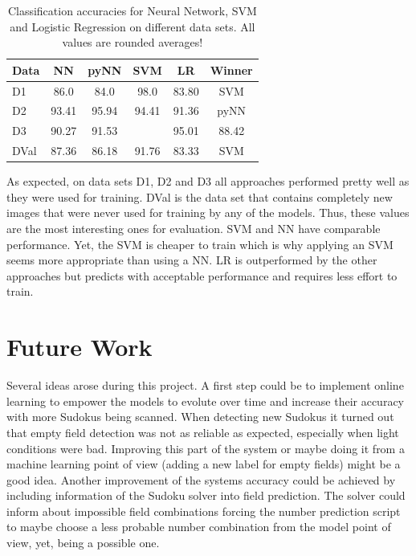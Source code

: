 \documentclass{article}
\begin{document}
\begin{table}[t]
\caption{Classification accuracies for Neural Network, SVM and Logistic Regression on different data sets. All values are rounded averages!}
\label{sample-table}
\vskip 0.15in
\begin{center}
\begin{small}
\begin{sc}
\begin{tabular}{lccccc}
\hline
\abovespace\belowspace
Data & NN & pyNN & SVM & LR & Winner \\
\hline
\abovespace
D1 		& 86.0 & 84.0 & 98.0 & 83.80 & SVM\\
D2		& 93.41 & 95.94 & 94.41 & 91.36 & pyNN\\
D3		& 90.27 & 91.53& & 95.01 & 88.42 \\
\belowspace
DVal	& 87.36 & 86.18 & 91.76 & 83.33 & SVM\\
\hline
\end{tabular}
\end{sc}
\end{small}
\end{center}
\vskip -0.1in
\end{table}
As expected, on data sets D1, D2 and D3 all approaches performed pretty well as they were used for training. DVal is the data set that contains completely new images that were never used for training by any of the models. Thus, these values are the most interesting ones for evaluation. SVM and NN have comparable performance. Yet, the SVM is cheaper to train which is why applying an SVM seems more appropriate than using a NN. LR is outperformed by the other approaches but predicts with acceptable performance and requires less effort to train.

\section{Future Work}
Several ideas arose during this project. A first step could be to implement online learning to empower the models to evolute over time and increase their accuracy with more Sudokus being scanned. When detecting new Sudokus it turned out that empty field detection was not as reliable as expected, especially when light conditions were bad. Improving this part of the system or maybe doing it from a machine learning point of view (adding a new label for empty fields) might be a good idea. Another improvement of the systems accuracy could be achieved by including information of the Sudoku solver into field prediction. The solver could inform about impossible field combinations forcing the number prediction script to maybe choose a less probable number combination from the model point of view, yet, being a possible one.



\end{document}

